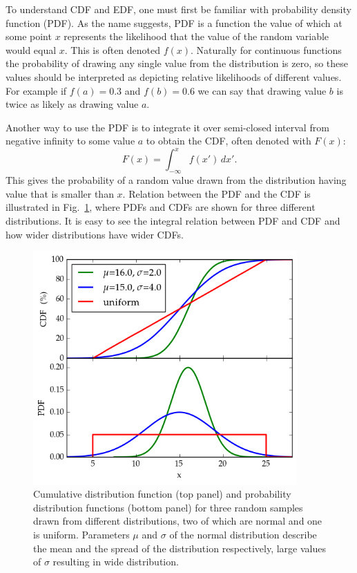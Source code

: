 \documentclass[english, oneside]{HYgradu}
\begin{document}
To understand CDF and EDF, one must first be familiar with probability density function (PDF).
As the name suggests, PDF is a function the value of which at some point $x$ represents the likelihood that the value of the random variable would equal $x$. This is often denoted $f(x)$. Naturally for continuous functions the probability of drawing any single value from the distribution is zero, so these values should be interpreted as depicting relative likelihoods of different values. For example if $f(a)=0.3$ and $f(b)=0.6$ we can say that drawing value $b$ is twice as likely as drawing value $a$. \citep{htk}

Another way to use the PDF is to integrate it over semi-closed interval from negative infinity to some value $a$ to obtain the CDF, often denoted with $F(x)$:
\begin{equation}
	F(x) = \int_{-\infty}^x f(x') \,dx'.
\end{equation}	
This gives the probability of a random value drawn from the distribution having value that is smaller than $x$. Relation between the PDF and the CDF is illustrated in Fig.\ \ref{fig:cdf}, where PDFs and CDFs are shown for three different distributions. It is easy to see the integral relation between PDF and CDF and how wider distributions have wider CDFs. \citep{htk}

\begin{figure}
   \centering
   \includegraphics[width=0.9\textwidth]{kuvat/cdf.png}
   \caption{Cumulative distribution function (top panel) and probability distribution functions (bottom panel) for three random samples drawn from different distributions, two of which are normal and one is uniform. Parameters $\mu$ and $\sigma$ of the normal distribution describe the mean and the spread of the distribution respectively, large values of $\sigma$ resulting in wide distribution.}
   \label{fig:cdf}

\end{figure}
\end{document}
